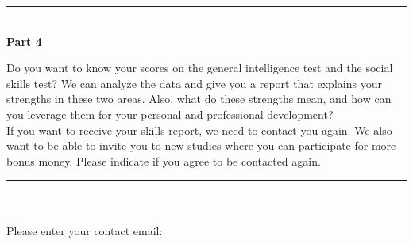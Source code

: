 \documentclass[11pt,a4paper,oneside]{article}
\begin{document}
\noindent\rule{\textwidth}{0.4pt}\\

\noindent \textbf{Part 4}

\noindent Do you want to know your scores on the general intelligence test and the social skills test? We can analyze the data and give you a report that explains your strengths in these two areas. Also, what do these strengths mean, and how can you leverage them for your personal and professional development? \\

\noindent If you want to receive your skills report, we need to contact you again. We also want to be able to invite you to new studies where you can participate for more bonus money. Please indicate if you agree to be contacted again. \\


\noindent\rule{\textwidth}{0.4pt}\\

 \\

\noindent Please enter your contact email: \\

\\
\end{document}

